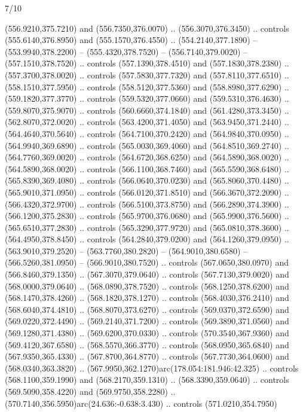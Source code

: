 \begin{flagdescription}{7/10}
\begin{scope}[xshift=0.5\flaglength]
\begin{scope}[scale=0.00185\flagwidth,yshift=245mm,xshift=-43.7mm]
\begin{scope}[y=-0.8pt, x=0.8pt, inner sep=0pt, outer sep=0pt]
\begin{scope}[shift={(-344.0678,183.89831)}]
  (556.9210,375.7210) and (556.7350,376.0070) .. (556.3070,376.3450) .. controls
  (555.6140,376.8950) and (555.1570,376.4550) .. (554.2140,377.1890) --
  (553.9940,378.2200) -- (555.4320,378.7520) -- (556.7140,379.0020) --
  (557.1510,378.7520) .. controls (557.1390,378.4510) and (557.1830,378.2380) ..
  (557.3700,378.0020) .. controls (557.5830,377.7320) and (557.8110,377.6510) ..
  (558.1510,377.5950) .. controls (558.5120,377.5360) and (558.8980,377.6290) ..
  (559.1820,377.3770) .. controls (559.5320,377.0660) and (559.5310,376.4630) ..
  (559.8070,375.9070) .. controls (560.6660,374.1840) and (561.4280,373.3450) ..
  (562.8070,372.0020) .. controls (563.4200,371.4050) and (563.9450,371.2440) ..
  (564.4640,370.5640) .. controls (564.7100,370.2420) and (564.9840,370.0950) ..
  (564.9940,369.6890) .. controls (565.0030,369.4060) and (564.8510,369.2740) ..
  (564.7760,369.0020) .. controls (564.6720,368.6250) and (564.5890,368.0020) ..
  (564.5890,368.0020) .. controls (566.1100,368.7460) and (565.5590,368.6480) ..
  (565.8390,369.4080) .. controls (566.0640,370.0230) and (565.8060,370.4480) ..
  (565.9010,371.0950) .. controls (566.0120,371.8510) and (566.3670,372.2090) ..
  (566.4320,372.9700) .. controls (566.5100,373.8750) and (566.2890,374.3900) ..
  (566.1200,375.2830) .. controls (565.9700,376.0680) and (565.9900,376.5600) ..
  (565.6510,377.2830) .. controls (565.3290,377.9720) and (565.0810,378.3600) ..
  (564.4950,378.8450) .. controls (564.2840,379.0200) and (564.1260,379.0950) ..
  (563.9010,379.2520) -- (563.7760,380.2820) -- (564.9010,380.6580) --
  (566.5260,381.0950) -- (566.9010,380.7520) .. controls (567.0650,380.0970) and
  (566.8460,379.1350) .. (567.3070,379.0640) .. controls (567.7130,379.0020) and
  (568.0000,379.0640) .. (568.0890,378.7520) .. controls (568.1250,378.6200) and
  (568.1470,378.4260) .. (568.1820,378.1270) .. controls (568.4030,376.2410) and
  (568.6040,374.4810) .. (568.8070,373.6270) .. controls (569.0370,372.6590) and
  (569.0220,372.4490) .. (569.2140,371.7200) .. controls (569.3890,371.0560) and
  (569.1280,371.4380) .. (569.6200,370.0330) .. controls (570.3540,367.9360) and
  (569.4120,367.6580) .. (568.5570,366.3770) .. controls (568.0950,365.6840) and
  (567.9350,365.4330) .. (567.8700,364.8770) .. controls (567.7730,364.0600) and
  (568.0340,363.3820) .. (567.9950,362.1270)arc(178.054:181.946:42.325) ..
  controls (568.1100,359.1990) and (568.2170,359.1310) .. (568.3390,359.0640) ..
  controls (569.5090,358.4220) and (569.9750,358.2280) ..
  (570.7140,356.5950)arc(24.636:-0.638:3.430) .. controls (571.0210,354.7950)

\end{scope}
\end{scope}
\end{scope}
\end{scope}
\end{flagdescription}
